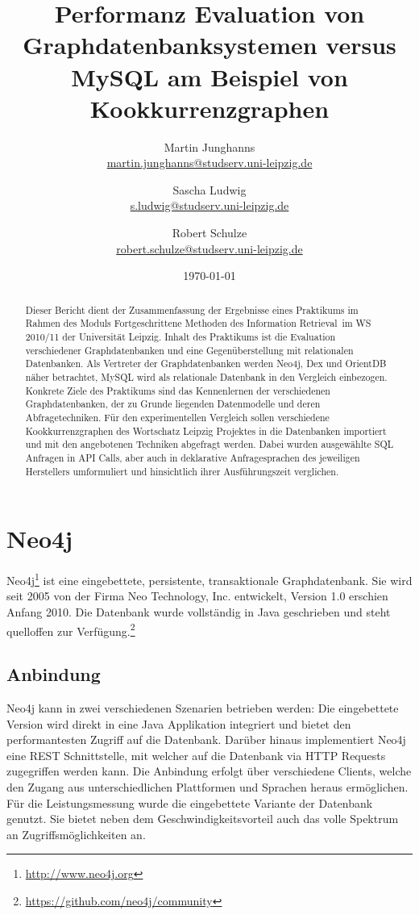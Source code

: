 \documentclass[11pt, a4paper, oneside, twocolumn]{article} %
\author{Martin Junghanns \\  \url{martin.junghanns@studserv.uni-leipzig.de} \and 
		Sascha Ludwig \\ \url{s.ludwig@studserv.uni-leipzig.de} \and 
		Robert Schulze \\ \url{robert.schulze@studserv.uni-leipzig.de} }
\date{\today}
\title{Performanz Evaluation von Graphdatenbanksystemen versus MySQL am Beispiel von Kookkurrenzgraphen }
\begin{document}
\renewcommand{\labelitemi}{-}

\maketitle

\begin{abstract}
	Dieser Bericht dient der Zusammenfassung der Ergebnisse eines Praktikums im Rahmen des Moduls \dq Fortgeschrittene Methoden des Information Retrieval\dq~im WS 2010/11 der Universität Leipzig. Inhalt des Praktikums ist die Evaluation verschiedener Graphdatenbanken und eine Gegenüberstellung mit relationalen Datenbanken. Als Vertreter der Graphdatenbanken werden Neo4j, Dex und OrientDB näher betrachtet, MySQL wird als relationale Datenbank in den Vergleich einbezogen.\\
Konkrete Ziele des Praktikums sind das Kennenlernen der verschiedenen Graphdatenbanken, der zu Grunde liegenden Datenmodelle und deren Abfragetechniken. Für den experimentellen Vergleich sollen verschiedene Kookkurrenzgraphen des Wortschatz Leipzig Projektes in die Datenbanken importiert und mit den angebotenen Techniken abgefragt werden. Dabei wurden ausgewählte SQL Anfragen in API Calls, aber auch in deklarative Anfragesprachen des jeweiligen Herstellers umformuliert und hinsichtlich ihrer Ausführungszeit verglichen.\\
\end{abstract}

\section{Neo4j}

Neo4j\footnote{\url{http://www.neo4j.org}} ist eine eingebettete, persistente, transaktionale Graphdatenbank. Sie wird seit 2005 von der Firma Neo Technology, Inc. entwickelt, Version 1.0 erschien Anfang 2010. Die Datenbank wurde vollständig in Java geschrieben und steht quelloffen zur Verfügung.\footnote{\url{https://github.com/neo4j/community}}

\subsection{Anbindung}

Neo4j kann in zwei verschiedenen Szenarien betrieben werden: Die eingebettete Version wird direkt in eine Java Applikation integriert und bietet den performantesten Zugriff auf die Datenbank. Darüber hinaus implementiert Neo4j eine REST Schnittstelle, mit welcher auf die Datenbank via HTTP Requests zugegriffen werden kann. Die Anbindung erfolgt über verschiedene Clients, welche den Zugang aus unterschiedlichen Plattformen und Sprachen heraus ermöglichen.\\
Für die Leistungsmessung wurde die eingebettete Variante der Datenbank genutzt. Sie bietet neben dem Geschwindigkeitsvorteil auch das volle Spektrum an Zugriffsmöglichkeiten an.
\end{document}
